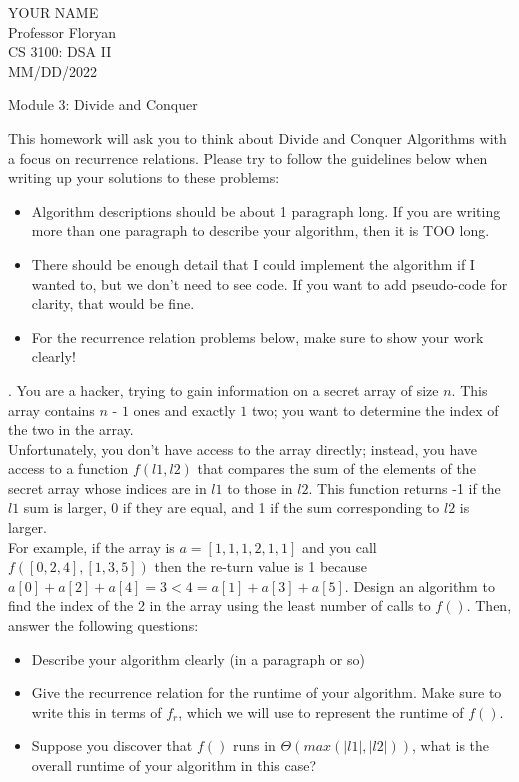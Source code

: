 \documentclass[12pt]{article}
\begin{document}
\begin{flushleft}

YOUR NAME\\
Professor Floryan\\
CS 3100: DSA II\\
MM/DD/2022\\

\begin{center}
Module 3: Divide and Conquer
\end{center}

\setlength{\parindent}{0.5in}

\noindent This homework will ask you to think about Divide and Conquer Algorithms with a focus on
recurrence relations. Please try to follow the guidelines below when writing up your solutions
to these problems:\\
\begin{itemize}
    \item Algorithm descriptions should be about 1 paragraph long. If you are writing more than
one paragraph to describe your algorithm, then it is TOO long.
    \item There should be enough detail that I could implement the algorithm if I wanted to, but we
don’t need to see code. If you want to add pseudo-code for clarity, that would be fine.
    \item For the recurrence relation problems below, make sure to show your work clearly!
\end{itemize}
\bigskip



\newpage
{}. You are a hacker, trying to gain information on a secret array of size $n$. This array contains
$n$ - $1$ ones and exactly $1$ two; you want to determine the index of the two in the array.\\
\medskip
\noindent Unfortunately, you don’t have access to the array directly; instead, you have access to a function $f(l1, l2)$ that compares the sum of the elements of the secret array whose indices are in $l1$ to those in $l2$. This function returns -1 if the $l1$ sum is larger, 0 if they are equal, and 1 if the sum corresponding to $l2$ is larger.\\
\medskip
\noindent For example, if the array is $a = [1, 1, 1, 2, 1, 1]$ and you call $f([0, 2, 4], [1, 3, 5])$ then the re-turn value is 1 because $a[0] + a[2] + a[4] = 3 < 4 = a[1] + a[3] + a[5]$. Design an algorithm to find the index of the 2 in the array using the least number of calls to $f()$. Then, answer the following questions:
\begin{itemize}
    \item Describe your algorithm clearly (in a paragraph or so)
    \item Give the recurrence relation for the runtime of your algorithm. Make sure to write this
in terms of $f_r$, which we will use to represent the runtime of $f()$.
    \item Suppose you discover that $f()$ runs in $\Theta(max(|l1|, |l2|))$, what is the overall runtime of
your algorithm in this case?
\end{itemize}
\hrulefill
\bigskip


\end{flushleft}
\end{document}
